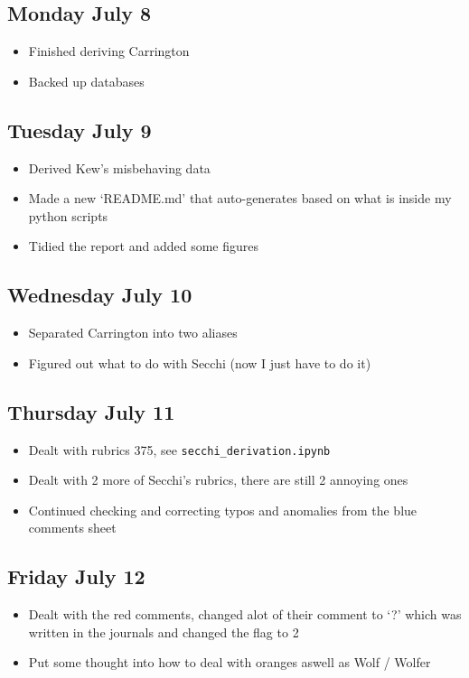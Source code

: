 \documentclass[12pt]{article}
\begin{document}
\subsection{Monday July 8}
\begin{itemize}
    \item Finished deriving Carrington
    \item Backed up databases
\end{itemize}

\subsection{Tuesday July 9}
\begin{itemize}
    \item Derived Kew's misbehaving data
    \item Made a new `README.md' that auto-generates based on what is inside my python scripts
    \item Tidied the report and added some figures
\end{itemize}

\subsection{Wednesday July 10}
\begin{itemize}
    \item Separated Carrington into two aliases
    \item Figured out what to do with Secchi (now I just have to do it)
\end{itemize}

\subsection{Thursday July 11}
\begin{itemize}
    \item Dealt with rubrics 375, see \texttt{secchi\_derivation.ipynb}
    \item Dealt with 2 more of Secchi's rubrics, there are still 2 annoying ones
    \item Continued checking and correcting typos and anomalies from the blue comments sheet
\end{itemize}

\subsection{Friday July 12}
\begin{itemize}
    \item Dealt with the red comments, changed alot of their comment to `?' which was written in the journals and changed the flag to 2
    \item Put some thought into how to deal with oranges aswell as Wolf / Wolfer
\end{itemize}
\end{document}
